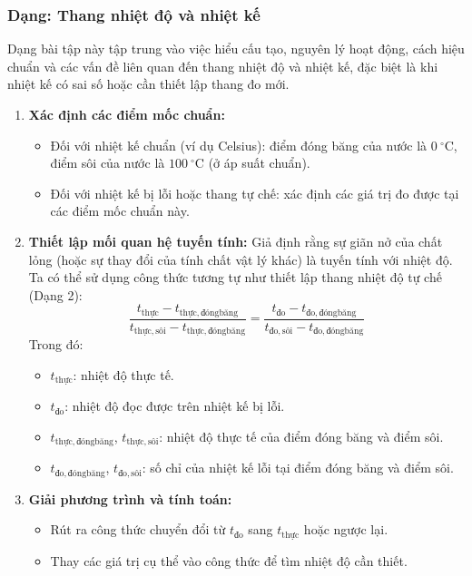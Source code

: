 \subsubsection{Dạng: Thang nhiệt độ và nhiệt kế}
\begin{phuongphap}
	Dạng bài tập này tập trung vào việc hiểu cấu tạo, nguyên lý hoạt động, cách hiệu chuẩn và các vấn đề liên quan đến thang nhiệt độ và nhiệt kế, đặc biệt là khi nhiệt kế có sai số hoặc cần thiết lập thang đo mới.
	\begin{enumerate}
		\item \textbf{Xác định các điểm mốc chuẩn:}
		\begin{itemize}
			\item Đối với nhiệt kế chuẩn (ví dụ Celsius): điểm đóng băng của nước là $0\ ^\circ\mathrm{C}$, điểm sôi của nước là $100\ ^\circ\mathrm{C}$ (ở áp suất chuẩn).
			\item Đối với nhiệt kế bị lỗi hoặc thang tự chế: xác định các giá trị đo được tại các điểm mốc chuẩn này.
		\end{itemize}
		\item \textbf{Thiết lập mối quan hệ tuyến tính:}
		Giả định rằng sự giãn nở của chất lỏng (hoặc sự thay đổi của tính chất vật lý khác) là tuyến tính với nhiệt độ. Ta có thể sử dụng công thức tương tự như thiết lập thang nhiệt độ tự chế (Dạng 2):
		\[
			\dfrac{t_{\mathrm{thực}} - t_{\mathrm{thực,đóng băng}}}{t_{\mathrm{thực,sôi}} - t_{\mathrm{thực,đóng băng}}} = \dfrac{t_{\mathrm{đo}} - t_{\mathrm{đo,đóng băng}}}{t_{\mathrm{đo,sôi}} - t_{\mathrm{đo,đóng băng}}}
		\]
		Trong đó:
		\begin{itemize}
			\item $t_{\mathrm{thực}}$: nhiệt độ thực tế.
			\item $t_{\mathrm{đo}}$: nhiệt độ đọc được trên nhiệt kế bị lỗi.
			\item $t_{\mathrm{thực,đóng băng}}$, $t_{\mathrm{thực,sôi}}$: nhiệt độ thực tế của điểm đóng băng và điểm sôi.
			\item $t_{\mathrm{đo,đóng băng}}$, $t_{\mathrm{đo,sôi}}$: số chỉ của nhiệt kế lỗi tại điểm đóng băng và điểm sôi.
		\end{itemize}
		\item \textbf{Giải phương trình và tính toán:}
		\begin{itemize}
			\item Rút ra công thức chuyển đổi từ $t_{\mathrm{đo}}$ sang $t_{\mathrm{thực}}$ hoặc ngược lại.
			\item Thay các giá trị cụ thể vào công thức để tìm nhiệt độ cần thiết.

\end{itemize}
\end{enumerate}
\end{phuongphap}
